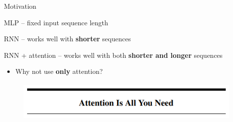 \documentclass[12pt,aspectratio=169,handout]{beamer}
\begin{document}
\begin{frame}{Motivation}

MLP -- fixed input sequence length 

RNN -- works well with \textbf{shorter} sequences

RNN + attention -- works well with both \textbf{shorter and longer} sequences

\pause

\begin{itemize}
	\item Why not use \textbf{only} attention?
\end{itemize}

\pause

\begin{center}
\begin{figure}[h]
	\includegraphics[height=2cm]{aiayn}
\end{figure}
\end{center}

\end{frame}
\end{document}
